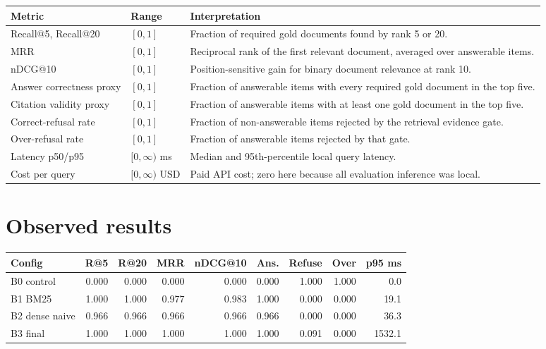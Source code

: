 \documentclass[11pt]{article}
\begin{document}
\begin{longtable}{p{}p{}p{}}
\hline
Metric & Range & Interpretation \\
\hline
Recall@5, Recall@20 & $[0,1]$ & Fraction of required gold documents found by rank 5 or 20. \\
MRR & $[0,1]$ & Reciprocal rank of the first relevant document, averaged over answerable items. \\
nDCG@10 & $[0,1]$ & Position-sensitive gain for binary document relevance at rank 10. \\
Answer correctness proxy & $[0,1]$ & Fraction of answerable items with every required gold document in the top five. \\
Citation validity proxy & $[0,1]$ & Fraction of answerable items with at least one gold document in the top five. \\
Correct-refusal rate & $[0,1]$ & Fraction of non-answerable items rejected by the retrieval evidence gate. \\
Over-refusal rate & $[0,1]$ & Fraction of answerable items rejected by that gate. \\
Latency p50/p95 & $[0,\infty)$ ms & Median and 95th-percentile local query latency. \\
Cost per query & $[0,\infty)$ USD & Paid API cost; zero here because all evaluation inference was local. \\
\hline
\end{longtable}

\section{Observed results}

\small
\begin{center}
\begin{tabular}{lrrrrrrrr}
\hline
Config & R@5 & R@20 & MRR & nDCG@10 & Ans. & Refuse & Over & p95 ms \\
\hline
B0 control & 0.000 & 0.000 & 0.000 & 0.000 & 0.000 & 1.000 & 1.000 & 0.0 \\
B1 BM25 & 1.000 & 1.000 & 0.977 & 0.983 & 1.000 & 0.000 & 0.000 & 19.1 \\
B2 dense naive & 0.966 & 0.966 & 0.966 & 0.966 & 0.966 & 0.000 & 0.000 & 36.3 \\
B3 final & 1.000 & 1.000 & 1.000 & 1.000 & 1.000 & 0.091 & 0.000 & 1532.1 \\
\hline
\end{tabular}
\end{center}
\normalsize
\end{document}
